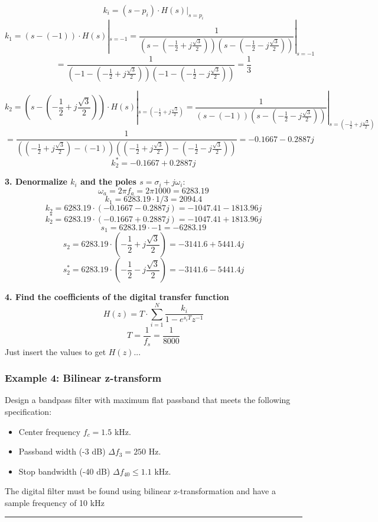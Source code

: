$$k_{i}=(s-p_{i})\cdot H(s)\vert_{s=p_{i}}$$
$$k_{1}=(s-(-1))\cdot H(s)|_{s=-1}=\frac{1}{(s-(-\frac{1}{2}+j\frac{\sqrt{3}}{2}))(s-(-\frac{1}{2}-j\frac{\sqrt{3}}{2}))}|_{s=-1}$$
$$=\frac{1}{(-1-(-\frac{1}{2}+j\frac{\sqrt{3}}{2}))(-1-(-\frac{1}{2}-j\frac{\sqrt{3}}{2}))}=\frac{1}{3}$$

$$k_{2}=(s-(-\frac{1}{2}+j\frac{\sqrt{3}}{2}))\cdot H(s)|_{s=(-\frac{1}{2}+j\frac{\sqrt{3}}{2})}=\frac{1}{(s-(-1))(s-(-\frac{1}{2}-j\frac{\sqrt{3}}{2}))}|_{s=(-\frac{1}{2}+j\frac{\sqrt{3}}{2})}$$
$$=\frac{1}{((-\frac{1}{2}+j\frac{\sqrt{3}}{2})-(-1))((-\frac{1}{2}+j\frac{\sqrt{3}}{2})-(-\frac{1}{2}-j\frac{\sqrt{3}}{2}))}=-0.1667-0.2887j$$
$$k_2^*=-0.1667+0.2887j$$

\textbf{3. Denormalize $k_i$ and the poles $s=\sigma_i+j\omega_i$}:
$$\omega_a=2\pi f_a=2\pi 1000=6283.19$$
$$k_1=6283.19\cdot 1/3=2094.4$$
$$k_2=6283.19\cdot (-0.1667-0.2887j)=-1047.41 - 1813.96j$$
$$k_2^*=6283.19\cdot (-0.1667+0.2887j)=-1047.41 + 1813.96j$$
$$s_1=6283.19\cdot-1=-6283.19$$
$$s_2=6283.19\cdot\left(-\frac{1}{2}+j\frac{\sqrt{3}}{2}\right)=-3141.6 + 5441.4j$$
$$s_2^*=6283.19\cdot\left(-\frac{1}{2}-j\frac{\sqrt{3}}{2}\right)=-3141.6 - 5441.4j$$

\textbf{4. Find the coefficients of the digital transfer function}
$$H(z)=T\cdot \sum_{i=1}^N \frac{k_i}{1-e^{s_i T}z^{-1}}$$
$$T=\frac{1}{f_s}=\frac{1}{8000}$$
Just insert the values to get $H(z)$...
\subsubsection{Example 4: Bilinear z-transform}
Design a bandpass filter with maximum flat passband that meets the following specification:
\begin{itemize}
  \item Center frequency $f_c= 1.5$ kHz.
  \item Passband width (-3 dB) $\Delta f_3= 250$ Hz.
  \item Stop bandwidth (-40 dB) $\Delta f_{40}\leq 1.1$ kHz.
\end{itemize}
The digital filter must be found using bilinear z-transformation and have a sample frequency of 10 kHz

\rule{\textwidth}{0.5pt}

